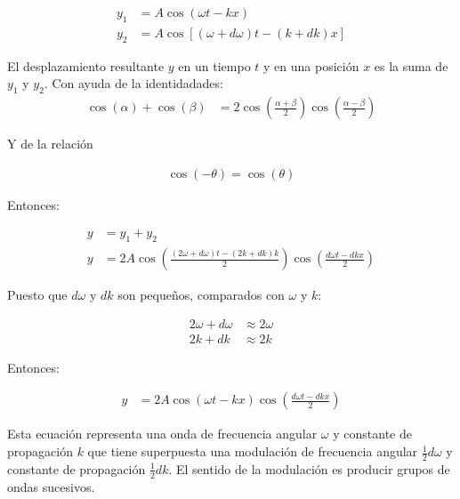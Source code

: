 \documentclass[a4paper]{article}
\begin{document}
    \begin{align}
        y_1 &= A \cos(\omega t - kx) \tag*{} \\[10pt]
        y_2 &= A \cos[(\omega + d\omega) t - (k + dk)x] \tag*{}
    \end{align}

    \indent El desplazamiento resultante $y$ en un tiempo $t$ y en una posición $x$ es la suma de $y_1$ y $y_2$. Con ayuda de la identidadades: \\

    \begin{align}
        \cos(\alpha)+\cos(\beta ) &= 2 \cos(\frac{\alpha+\beta}{2})\cos{(\frac{\alpha-\beta}{2})} \tag*{}
    \end{align}

    \indent Y de la relación

    \begin{align}
        \cos(-\theta)=\cos(\theta) \tag*{}
    \end{align}

    \indent Entonces:

    \begin{align}
        y &= y_1 + y_2 \tag*{} \\[10pt]
        y &= 2A \cos(\frac{(2\omega+ d\omega)t-(2k+dk)k}{2})\cos(\frac{d\omega t-dkx}{2}) \tag*{} 
    \end{align}

    \newpage
    \noindent
    \thispagestyle{fancy}

    \indent Puesto que \( d\omega \) y \( dk \) son pequeños, comparados con \( \omega \) y \( k \): 

    \begin{align}
        2\omega + d\omega &\approx 2\omega \tag*{} \\[10pt]
        2k + dk &\approx 2k \tag*{}
    \end{align}

    \indent Entonces:

    \begin{align}
        y &= 2A \cos(\omega t - kx) \cos(\frac{d\omega t - dkx}{2}) \tag*{} 
    \end{align}

    \indent Esta ecuación representa una onda de frecuencia angular \( \omega \) y constante de propagación \( k \) que tiene superpuesta una modulación de frecuencia angular \( \frac{1}{2}d\omega \) y constante de propagación \( \frac{1}{2}dk \). El sentido de la modulación es producir grupos de ondas sucesivos. \\
\end{document}
